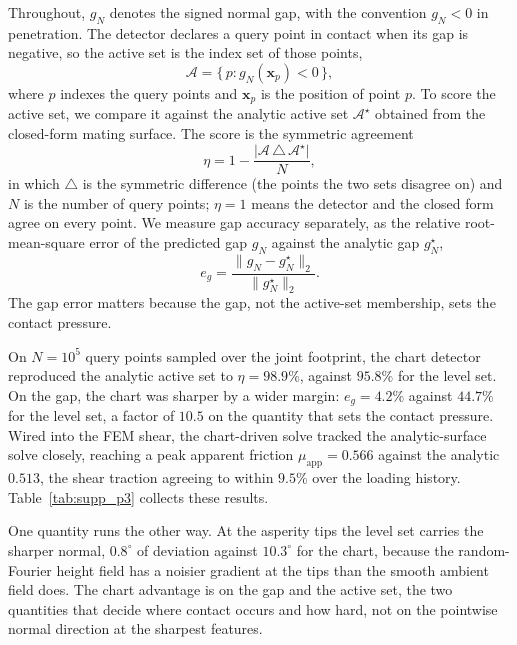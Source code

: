 \documentclass{svjour3}                 %
\newcommand{\norm}[1]{\lVert#1\rVert}
\newcommand{\abs}[1]{\lvert#1\rvert}
\newcommand{\xbf}{\bm{x}}
\newcommand{\gn}{g_{\scriptscriptstyle N}}
\newcommand{\muapp}{\mu_{\mathrm{app}}}
\begin{document}
\begin{appendix}
Throughout, $\gn$ denotes the signed normal gap, with the convention $\gn<0$ in penetration. The detector
declares a query point in contact when its gap is negative, so the active set is the index set of those
points,
%
\begin{equation}\label{eq:supp_activeset}
\mathcal{A}=\{\,p : \gn(\xbf_p)<0\,\},
\end{equation}
%
where $p$ indexes the query points and $\xbf_p$ is the position of point $p$. To score the active set, we
compare it against the analytic active set $\mathcal{A}^{\star}$ obtained from the closed-form
mating surface. The score is the symmetric agreement
%
\begin{equation}\label{eq:supp_agreement}
\eta=1-\frac{\abs{\mathcal{A}\,\triangle\,\mathcal{A}^{\star}}}{N},
\end{equation}
%
in which $\triangle$ is the symmetric difference (the points the two sets disagree on) and $N$ is the
number of query points; $\eta=1$ means the detector and the closed form agree on every point. We measure
gap accuracy separately, as the relative root-mean-square error of the predicted gap $\gn$ against the
analytic gap $\gn^{\star}$,
%
\begin{equation}\label{eq:supp_gaprmse}
e_g=\frac{\norm{\gn-\gn^{\star}}_{2}}{\norm{\gn^{\star}}_{2}}.
\end{equation}
%
The gap error matters because the gap, not the active-set membership, sets the contact pressure.

On $N=10^{5}$ query points sampled over the joint footprint, the chart detector reproduced the analytic
active set to $\eta=98.9\%$, against $95.8\%$ for the level set. On the gap, the chart was sharper by a
wider margin: $e_g=4.2\%$ against $44.7\%$ for the level set, a factor of $10.5$ on the
quantity that sets the contact pressure. Wired into the FEM shear, the chart-driven solve tracked the
analytic-surface solve closely, reaching a peak apparent friction $\muapp=0.566$ against the analytic
$0.513$, the shear traction agreeing to within $9.5\%$ over the loading history. Table~\ref{tab:supp_p3}
collects these results.

One quantity runs the other way. At the asperity tips the level set carries the sharper
normal, $0.8^{\circ}$ of deviation against $10.3^{\circ}$ for the chart, because the random-Fourier height
field has a noisier gradient at the tips than the smooth ambient field does. The chart advantage is on the
gap and the active set, the two quantities that decide where contact occurs and how hard, not on the
pointwise normal direction at the sharpest features.


\end{appendix}
\end{document}
